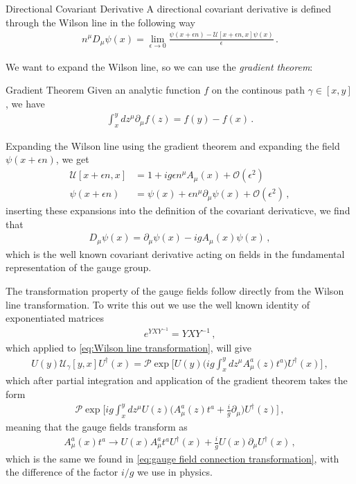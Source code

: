 \medskip
\begin{mydef}{Directional Covariant Derivative}{}
A directional covariant derivative is defined through the Wilson line in the following way
\begin{align}
    n^{\mu}D_{\mu}\psi(x)=\lim_{\epsilon\to 0}\frac{\psi(x+\epsilon n)-\mathcal{U}[x+\epsilon n,x]\psi(x)}{\epsilon}\,.\nonumber
\end{align}
\end{mydef}\noindent
We want to expand the Wilson line, so we can use the \emph{gradient theorem}:
\medskip
\begin{mytheo}{Gradient Theorem}{}
Given an analytic function $f$ on the continous path $\gamma\in[x,y]$, we have
\begin{align}
    \int_{x}^{y}dz^{\mu}\partial_{\mu}f(z)=f(y)-f(x)\,.
\end{align}
\end{mytheo}\noindent
Expanding the Wilson line using the gradient theorem and expanding the field $\psi(x+\epsilon n)$, we get 
\begin{align}
    \mathcal{U}[x+\epsilon n,x]&=1+ig\epsilon n^{\mu}A_{\mu}(x)+\mathcal{O}(\epsilon^{2})
    \\
    \psi(x+\epsilon n)&=\psi(x)+\epsilon n^{\mu}\partial_{\mu}\psi(x)+\mathcal{O}(\epsilon^{2})\,,
\end{align}
inserting these expansions into the definition of the covariant derivaticve, we find that 
\begin{align}
    D_{\mu}\psi(x)=\partial_{\mu}\psi(x)-igA_{\mu}(x)\psi(x)\,,
\end{align}
which is the well known covariant derivative acting on fields in the fundamental representation of the gauge group.

\medskip
The transformation property of the gauge fields follow directly from the Wilson line transformation. To write this out we use the well known identity of exponentiated matrices
\begin{align}
    e^{YXY^{-1}}=YXY^{-1}\,,
\end{align}
which applied to \cref{eq:Wilson line transformation}, will give
\begin{align}
     U(y)\mathcal{U}_{\gamma}[y,x]U^{\dagger}(x)=\mathcal{P}\exp\Big[U(y)\big(ig\int_{x}^{y}dz^{\mu}A_{\mu}^{a}(z)t^{a}\Big)U^{\dagger}(x)\Big]\,,
\end{align}
which after partial integration and application of the gradient theorem takes the form
\begin{align}
    \mathcal{P}\exp\Big[ig\int_{x}^{y}dz^{\mu}U(z)\Big(A_{\mu}^{a}(z)t^{a}+\frac{i}{g}\partial_{\mu}\Big)U^{\dagger}(z)\Big]\,,
\end{align}
meaning that the gauge fields transform as
\begin{align}
    A_{\mu}^{a}(x)t^{a}\rightarrow U(x)A_{\mu}^{a}t^{a}U^{\dagger}(x)+\frac{i}{g}U(x)\partial_{\mu}U^{\dagger}(x)\,,
\end{align}
which is the same we found in \cref{eq:gauge field connection transformation}, with the difference  of the factor $i/g$ we use in physics.

